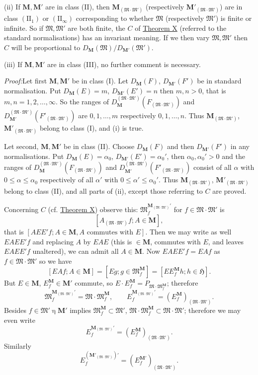 \documentclass[12pt,b5paper,twoside]{article}
\newcommand{\Hspace}{\mathfrak H}
\newcommand{\M}{\mathbf M}
\newcommand{\Proof}{\par\noindent\textit{Proof:}\enspace}
\newcommand{\thmref}[1]{\hyperref[thm:#1]{Theorem #1}}
\begin{document}
(ii) If $\M,\M'$ are in class (II), then
$\M_{(\mathfrak M\cdot\mathfrak M')}$ (respectively
$\M'_{(\mathfrak M\cdot\mathfrak M')}$) are in class
$(\mathrm{II}_1)$ or $(\mathrm{II}_\infty)$ corresponding to whether
$\mathfrak M$ (respectively $\mathfrak M'$) is finite or infinite. So if
$\mathfrak M,\mathfrak M'$ are both finite, the $C$ of \thmref{X}
(referred to the standard normalisations) has an invariant meaning. If we
then vary $\mathfrak M,\mathfrak M'$ then $C$ will be proportional to
$D_{\M}(\mathfrak M)/D_{\M'}(\mathfrak M')$.

(iii) If $\M,\M'$ are in class (III), no further comment is necessary.

\Proof Let first $\M,\M'$ be in class (I). Let $D_{\M}(F)$,
$D_{\M'}(F')$ be in standard normalisation. Put
$D_{\M}(E)=m$, $D_{\M'}(E')=n$ then $m,n>0$, that is
$m,n=1,2,\ldots,\infty$. So the ranges of
$D_{\M}^{(\mathfrak M\cdot\mathfrak M')}
(F_{(\mathfrak M\cdot\mathfrak M')})$ and
$D_{\M'}^{(\mathfrak M\cdot\mathfrak M')}
(F'_{(\mathfrak M\cdot\mathfrak M')})$ are
$0,1,\ldots,m$ respectively $0,1,\ldots,n$. Thus
$\M_{(\mathfrak M\cdot\mathfrak M')}$,
$\M'_{(\mathfrak M\cdot\mathfrak M')}$ belong to class (I), and (i) is
true.

Let second, $\M,\M'$ be in class (II). Choose $D_{\M}(F)$ and then
$D_{\M'}(F')$ in any normalisations. Put
$D_{\M}(E)=\alpha_0$, $D_{\M'}(E')=\alpha_0'$, then
$\alpha_0,\alpha_0'>0$ and the ranges of
$D_{\M}^{(\mathfrak M\cdot\mathfrak M')}
(F_{(\mathfrak M\cdot\mathfrak M')})$ and
$D_{\M'}^{(\mathfrak M\cdot\mathfrak M')}
(F'_{(\mathfrak M\cdot\mathfrak M')})$ consist of all $\alpha$ with
$0\leq\alpha\leq\alpha_0$ respectively of all $\alpha'$ with
$0\leq\alpha'\leq\alpha_0'$. Thus
$\M_{(\mathfrak M\cdot\mathfrak M')}$,
$\M'_{(\mathfrak M\cdot\mathfrak M')}$ belong to class (II), and all
parts of (ii), except those referring to $C$ are proved.

Concerning $C$ (cf. \thmref{X}) observe this:
$\mathfrak M_f^{\M_{(\mathfrak M\cdot\mathfrak M')}'}$ for
$f\in\mathfrak M\cdot\mathfrak M'$ is
\[
 [A_{(\mathfrak M\cdot\mathfrak M')}f;A\in\M],
\]
that is $[AEE'f;A\in\M, A\text{ commutes with }E]$. Then we may write as
well $EAEE'f$ and replacing $A$ by $EAE$ (this is $\in\M$, commutes with
$E$, and leaves $EAEE'f$ unaltered), we can admit all $A\in\M$. Now
$EAEE'f=EAf$ as $f\in\mathfrak M\cdot\mathfrak M'$ so we have
\[
 [EAf;A\in\M]=[Eg;g\in\mathfrak M_f^{\M}]
 =[EE_f^{\M}h;h\in\Hspace].
\]
But $E\in\M$, $E_f^{\M}\in\M'$ commute, so
$E\cdot E_f^{\M}=P_{\mathfrak M\cdot\mathfrak M_f^{\M}}$; therefore
\[
 \mathfrak M_f^{\M_{(\mathfrak M\cdot\mathfrak M')}'}
 =\mathfrak M\cdot\mathfrak M_f^{\M},
 \qquad
 E_f^{\M_{(\mathfrak M\cdot\mathfrak M')}'}
 =(E_f^{\M})_{(\mathfrak M\cdot\mathfrak M')}.
\]
Besides $f\in\mathfrak M'\mathbin\eta\M'$ implies
$\mathfrak M_f^{\M}\subset\mathfrak M'$,
$\mathfrak M\cdot\mathfrak M_f^{\M}\subset
\mathfrak M\cdot\mathfrak M'$; therefore we may even write
\[
 E_f^{\M_{(\mathfrak M\cdot\mathfrak M')}'}
 =(E_f^{\M})_{(\mathfrak M\cdot\mathfrak M')}.
\]
Similarly
\[
 E_f^{(\M'_{(\mathfrak M\cdot\mathfrak M')})'}
 =(E_f^{\M'})_{(\mathfrak M\cdot\mathfrak M')}.
\]
\end{document}
